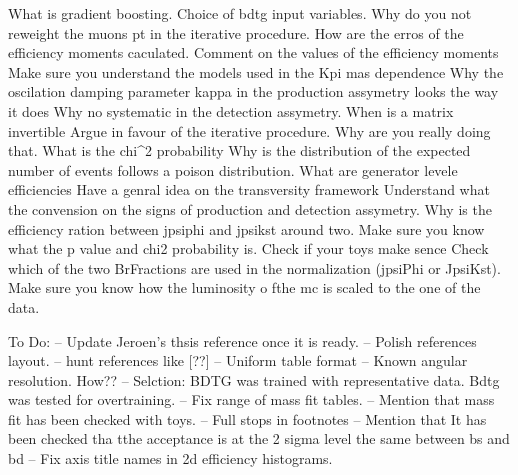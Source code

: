 
What is gradient boosting.
Choice of bdtg input variables.
Why do you not reweight the muons pt in the iterative procedure.
How are the erros of the efficiency moments caculated. 
Comment on the values of the efficiency moments
Make sure you understand the models used in the Kpi mas dependence
Why the oscilation damping parameter kappa in the production assymetry looks the way it does 
Why no systematic in the detection assymetry.
When is a matrix invertible
Argue in favour of the iterative procedure. Why are you really doing that.
What is the chi^2 probability
Why is the distribution of the expected number of events follows a poison distribution.
What are generator levele efficiencies
Have a genral idea on the transversity framework
Understand what the convension on the signs of production and detection assymetry.
Why is the efficiency ration between jpsiphi and jpsikst around two.
Make sure you know what the p value and chi2 probability is.
Check if your toys make sence
Check which of the two BrFractions are used in the normalization (jpsiPhi or JpsiKst).
Make sure you know how the luminosity o fthe mc is scaled to the one of the data.

To Do:
-- Update Jeroen's thsis reference once it is ready.
-- Polish references layout.
-- hunt references like [??]
-- Uniform table format
-- Known angular resolution. How??
-- Selction: BDTG was trained with representative data. Bdtg was tested for overtraining.
-- Fix range of mass fit tables.
-- Mention that mass fit has been checked with toys.
-- Full stops in footnotes
-- Mention that It has been checked tha tthe acceptance is at the 2 sigma level the same between bs and bd
-- Fix axis title names in 2d efficiency histograms.

